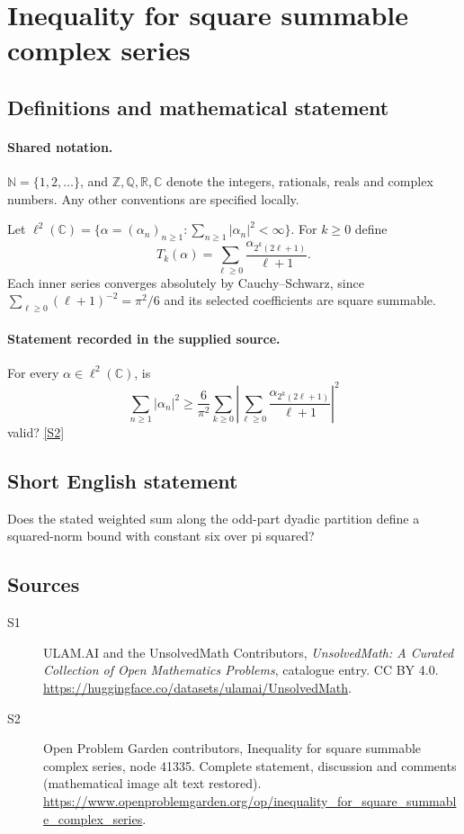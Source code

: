 \documentclass[11pt]{book}
\newcommand{\sref}[2]{\hyperlink{source:#1:#2}{[S#2]}}
\begin{document}
\section{Inequality for square summable complex series}\label{statement}

\subsection{Definitions and mathematical statement}

\paragraph{Shared notation.}$\mathbb N=\{1,2,\ldots\}$, and $\mathbb Z,\mathbb Q,\mathbb R,\mathbb C$ denote the integers, rationals, reals and complex numbers. Any other conventions are specified locally.


Let $\ell^2(\mathbb C)=\{\alpha=(\alpha_n)_{n\geq1}:\sum_{n\geq1}|\alpha_n|^2<\infty\}$. For $k\geq0$ define
\[T_k(\alpha)=\sum_{\ell\geq0}\frac{\alpha_{2^k(2\ell+1)}}{\ell+1}.\]
Each inner series converges absolutely by Cauchy--Schwarz, since $\sum_{\ell\geq0}(\ell+1)^{-2}=\pi^2/6$ and its selected coefficients are square summable.
\paragraph{Statement recorded in the supplied source.}
For every $\alpha\in\ell^2(\mathbb C)$, is
\[\sum_{n\geq1}|\alpha_n|^2\geq\frac{6}{\pi^2}\sum_{k\geq0}\left|\sum_{\ell\geq0}\frac{\alpha_{2^k(2\ell+1)}}{\ell+1}\right|^2\]
valid? \sref{statement}{2}
\subsection{Short English statement}
Does the stated weighted sum along the odd-part dyadic partition define a squared-norm bound with constant six over pi squared?
\subsection{Sources}
\begin{description}
\item[\hypertarget{source:statement:1}{S1}] ULAM.AI and the UnsolvedMath Contributors, \emph{UnsolvedMath: A Curated Collection of Open Mathematics Problems}, catalogue entry. CC BY 4.0. \url{https://huggingface.co/datasets/ulamai/UnsolvedMath}.
\item[\hypertarget{source:statement:2}{S2}] Open Problem Garden contributors, Inequality for square summable complex series, node 41335. Complete statement, discussion and comments (mathematical image alt text restored). \url{https://www.openproblemgarden.org/op/inequality_for_square_summable_complex_series}.
\end{description}
\label{end:statement}
\end{document}
